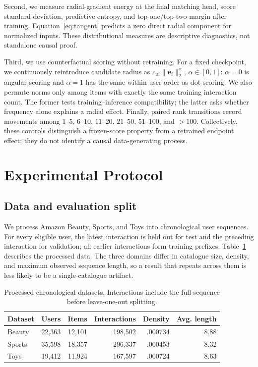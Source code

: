 \documentclass[sigconf,anonymous,review]{acmart}
\begin{document}
Second, we measure radial-gradient energy at the final matching head, score standard deviation, predictive entropy, and top-one/top-two margin after training. Equation~\ref{eq:tangent} predicts a zero direct radial component for normalized inputs. These distributional measures are descriptive diagnostics, not standalone causal proof.

Third, we use counterfactual scoring without retraining. For a fixed checkpoint, we continuously reintroduce candidate radius as $c_{ui}\|\bm e_i\|_2^\alpha$, $\alpha\in[0,1]$: $\alpha=0$ is angular scoring and $\alpha=1$ has the same within-user order as dot scoring. We also permute norms only among items with exactly the same training interaction count. The former tests training--inference compatibility; the latter asks whether frequency alone explains a radial effect. Finally, paired rank transitions record movements among $1$--$5$, $6$--$10$, $11$--$20$, $21$--$50$, $51$--$100$, and $>100$. Collectively, these controls distinguish a frozen-score property from a retrained endpoint effect; they do not identify a causal data-generating process.

\section{Experimental Protocol}
\subsection{Data and evaluation split}
We process Amazon Beauty, Sports, and Toys into chronological user sequences. For every eligible user, the latest interaction is held out for test and the preceding interaction for validation; all earlier interactions form training prefixes. Table~\ref{tab:data} describes the processed data. The three domains differ in catalogue size, density, and maximum observed sequence length, so a result that repeats across them is less likely to be a single-catalogue artifact.
\begin{table}[t]
\caption{Processed chronological datasets. Interactions include the full sequence before leave-one-out splitting.}\label{tab:data}
\centering\scriptsize
\begin{tabular}{lrrrrr}\toprule
Dataset&Users&Items&Interactions&Density&Avg. length\\\midrule
Beauty&22,363&12,101&198,502&.000734&8.88\\
Sports&35,598&18,357&296,337&.000453&8.32\\
Toys&19,412&11,924&167,597&.000724&8.63\\\bottomrule
\end{tabular}
\end{table}
\end{document}
